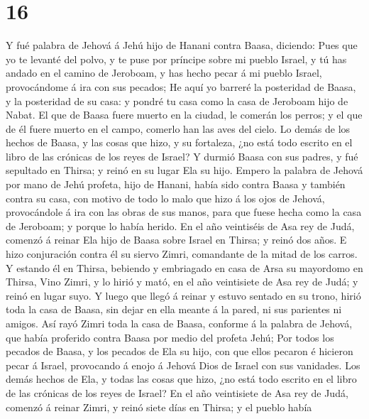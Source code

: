 \hypertarget{section-15}{%
\section{16}\label{section-15}}

 Y fué palabra de Jehová á Jehú hijo de Hanani contra
Baasa, diciendo:  Pues que yo te levanté del polvo, y te
puse por príncipe sobre mi pueblo Israel, y tú has andado en el camino
de Jeroboam, y has hecho pecar á mi pueblo Israel, provocándome á ira
con sus pecados;  He aquí yo barreré la posteridad de
Baasa, y la posteridad de su casa: y pondré tu casa como la casa de
Jeroboam hijo de Nabat.  El que de Baasa fuere muerto en
la ciudad, le comerán los perros; y el que de él fuere muerto en el
campo, comerlo han las aves del cielo.  Lo demás de los
hechos de Baasa, y las cosas que hizo, y su fortaleza, ¿no está todo
escrito en el libro de las crónicas de los reyes de Israel?
 Y durmió Baasa con sus padres, y fué sepultado en Thirsa;
y reinó en su lugar Ela su hijo.  Empero la palabra de
Jehová por mano de Jehú profeta, hijo de Hanani, había sido contra Baasa
y también contra su casa, con motivo de todo lo malo que hizo á los ojos
de Jehová, provocándole á ira con las obras de sus manos, para que fuese
hecha como la casa de Jeroboam; y porque lo había herido. 
En el año veintiséis de Asa rey de Judá, comenzó á reinar Ela hijo de
Baasa sobre Israel en Thirsa; y reinó dos años.  E hizo
conjuración contra él su siervo Zimri, comandante de la mitad de los
carros. Y estando él en Thirsa, bebiendo y embriagado en casa de Arsa su
mayordomo en Thirsa,  Vino Zimri, y lo hirió y mató, en
el año veintisiete de Asa rey de Judá; y reinó en lugar suyo.
 Y luego que llegó á reinar y estuvo sentado en su trono,
hirió toda la casa de Baasa, sin dejar en ella meante á la pared, ni sus
parientes ni amigos.  Así rayó Zimri toda la casa de
Baasa, conforme á la palabra de Jehová, que había proferido contra Baasa
por medio del profeta Jehú;  Por todos los pecados de
Baasa, y los pecados de Ela su hijo, con que ellos pecaron é hicieron
pecar á Israel, provocando á enojo á Jehová Dios de Israel con sus
vanidades.  Los demás hechos de Ela, y todas las cosas
que hizo, ¿no está todo escrito en el libro de las crónicas de los reyes
de Israel?  En el año veintisiete de Asa rey de Judá,
comenzó á reinar Zimri, y reinó siete días en Thirsa; y el pueblo había
